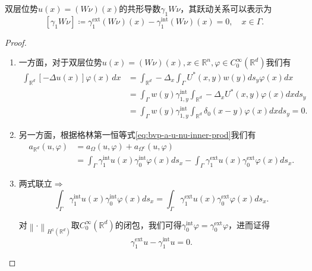 \begin{lemma}
  双层位势$u(x) = \left(W \nu \right)(x)$的共形导数$\gamma_{1} W \nu $，其跃动关系可以表示为
  \begin{equation}
    \label{eq:bvp-double-layer-gamma1-jumprelation}
    \left[ \gamma_{1} W \nu \right]
    \coloneqq \gamma_{1}^{\text{ext}} \left(W \nu \right)(x)
    - \gamma_{1}^{\text{int}} \left( W \nu \right)(x)
    =0, \quad x \in \Gamma.
  \end{equation}
\end{lemma}
\begin{proof}
  \begin{enumerate}
    \item 一方面，对于双层位势$u(x) = \left( W \nu \right)(x), x \in \mathbb{R}^{n}, \varphi \in C_{0}^{\infty}(\mathbb{R}^d)$我们有
    \begin{equation*}
      \begin{split}
        \int_{\mathbb{R}^d}
        \left[
        - \Delta u(x)
        \right]
        \varphi(x) \, d x &=
        \int_{\mathbb{R}^d}
        - \Delta_{x}
        \int_{\Gamma}
        U^{*}(x,y) w(y) ds_y
        \varphi(x) dx \\
        &= \int_{\Gamma} w(y)
        \gamma_{1,y}^{\text{int}}
        \int_{\mathbb{R}^d}
        - \Delta_{x} U^{*}(x,y) \varphi(x) dx
        d s_y \\
        & = \int_{\Gamma} w(y) \gamma_{1,y}^{\text{int}}
        \int_{\mathbb{R}^d} \delta_{0}(x-y) \varphi(x) d x d s_y
        =0.
      \end{split}
    \end{equation*}
    \item 另一方面，根据格林第一恒等式\eqref{eq:bvp-a-u-nu-inner-prod}我们有
    \begin{equation*}
      \begin{split}
        a_{\mathbb{R}^d}(u,\varphi)
        & = a_{\Omega}(u, \varphi) + a_{\Omega^{c}}(u, \varphi)\\
        & = \int_{\Gamma} \gamma_{1}^{\text{int}} u(x) \gamma_{0}^{\text{int}} \varphi(x) d s_x
        - \int_{\Gamma} \gamma_{1}^{\text{ext}} u(x) \gamma_{0}^{\text{ext}} \varphi(x) d s_x.
      \end{split}
    \end{equation*}
    \item 两式联立$\Rightarrow$
    \begin{equation*}
      \int_{\Gamma} \gamma_{1}^{\text{int}} u(x) \gamma_{0}^{\text{int}} \varphi(x) d s_x
      = \int_{\Gamma} \gamma_{1}^{\text{ext}} u(x)
      \gamma_{0}^{\text{ext}} \varphi(x) d s_x.
    \end{equation*}

    对$\left\| \cdot \right\|_{H^{1}(\mathbb{R}^d)}$取$C_{0}^{\infty}(\mathbb{R}^d)$的闭包，我们可得$\gamma_0^{\text{int}} \varphi = \gamma_{0}^{\text{ext}} \varphi$，进而证得
    \begin{equation*}
      \gamma_{1}^{\text{ext}} u - \gamma_{1}^{\text{int}} u = 0.
    \end{equation*}
  \end{enumerate}
\end{proof}
